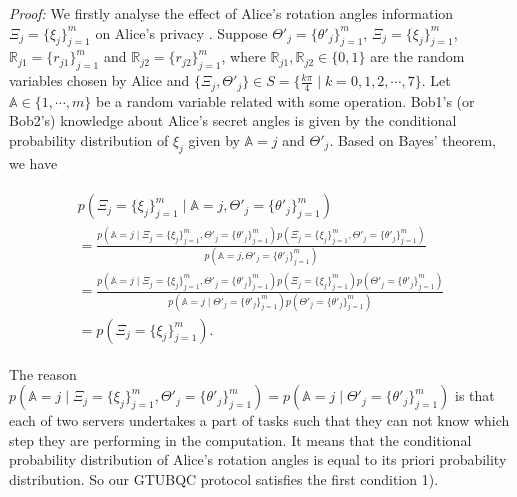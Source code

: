\documentclass[aps,pra,showpacs,twocolumn,superscriptaddress]{revtex4-1}
\begin{document}
\emph{Proof:} We firstly analyse the effect of Alice's rotation angles information $\Xi_j=\{\xi_j\}_{j=1}^m$ on Alice's {privacy \cite{5Morimae2012,8Morimae2015}}. Suppose $\Theta'_j=\{\theta'_j\}_{j=1}^m$, $\Xi_j=\{\xi_j\}_{j=1}^m$, $\mathbb{R}_{j1}=\{r_{j1}\}_{j=1}^m$ and $\mathbb{R}_{j2}=\{r_{j2}\}_{j=1}^m$, where $\mathbb{R}_{j1}, \mathbb{R}_{j2}\in\{0, 1\}$ are the random variables chosen by Alice and $\{\Xi_j, \Theta'_j \}\in S=\{\frac{k\pi}{4}\mid k=0, 1, 2, \cdots, 7\}$. Let $\mathbb{A}\in\{1,\cdots,m\}$ be a random variable related with some operation.
Bob1's (or Bob2's) knowledge about Alice's secret angles is given by the conditional probability distribution of $\xi_j$ given by $\mathbb{A}=j$ and $\Theta'_j$. Based on Bayes' theorem, we have
\begin{tiny}
\begin{eqnarray*}
\begin{array}{l}
\displaystyle p(\Xi_j=\{\xi_j\}_{j=1}^m \mid \mathbb{A}=j,\Theta'_j=\{\theta'_j\}_{j=1}^m)\\
\displaystyle =\frac{p(\mathbb{A}=j\mid \Xi_j=\{\xi_j\}_{j=1}^m,\Theta'_j=\{\theta'_j\}_{j=1}^m)p(\Xi_j=\{\xi_j\}_{j=1}^m,\Theta'_j=\{\theta'_j\}_{j=1}^m)}{p(\mathbb{A}=j,\Theta'_j=\{\theta'_j\}_{j=1}^m)}\\
\displaystyle =\frac{p(\mathbb{A}=j\mid \Xi_j=\{\xi_j\}_{j=1}^m,\Theta'_j=\{\theta'_j\}_{j=1}^m)p(\Xi_j=\{\xi_j\}_{j=1}^m)p(\Theta'_j=\{\theta'_j\}_{j=1}^m )}{p(\mathbb{A}=j\mid\Theta'_j=\{\theta'_j\}_{j=1}^m)p(\Theta'_j=\{\theta'_j\}_{j=1}^m)}\\
\displaystyle =p(\Xi_j=\{\xi_j\}_{j=1}^m).
\end{array}
\end{eqnarray*}
\end{tiny}
\noindent The reason $p(\mathbb{A}=j\mid \Xi_j=\{\xi_j\}_{j=1}^m,\Theta'_j=\{\theta'_j\}_{j=1}^m)=p(\mathbb{A}=j\mid\Theta'_j=\{\theta'_j\}_{j=1}^m)$ is that each of two servers undertakes a part of tasks such that they can not know which step they are performing in the computation. It means that the conditional probability distribution of Alice's rotation angles is equal to its priori probability distribution. So our GTUBQC protocol satisfies the first condition 1).
\end{document}
